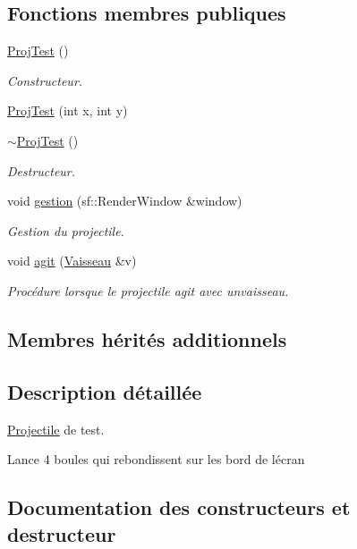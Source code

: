 \subsection*{Fonctions membres publiques}
\begin{DoxyCompactItemize}
\item 
\hyperlink{class_proj_test_a64855e6e7ef8219566ab0fde2b05a9e1}{Proj\+Test} ()
\begin{DoxyCompactList}\small\item\em Constructeur. \end{DoxyCompactList}\item 
\hyperlink{class_proj_test_ae1611498a5b25d561998068205e9f77f}{Proj\+Test} (int x, int y)
\item 
\hyperlink{class_proj_test_a9bc10c512035ae9f3294179c5d2db808}{$\sim$\+Proj\+Test} ()
\begin{DoxyCompactList}\small\item\em Destructeur. \end{DoxyCompactList}\item 
void \hyperlink{class_proj_test_a6649e6591e463315aa9513854e2515d4}{gestion} (sf\+::\+Render\+Window \&window)
\begin{DoxyCompactList}\small\item\em Gestion du projectile. \end{DoxyCompactList}\item 
void \hyperlink{class_proj_test_a3adb674973dcd21c6ddaee809b719a65}{agit} (\hyperlink{class_vaisseau}{Vaisseau} \&v)
\begin{DoxyCompactList}\small\item\em Procédure lorsque le projectile agit avec unvaisseau. \end{DoxyCompactList}\end{DoxyCompactItemize}
\subsection*{Membres hérités additionnels}


\subsection{Description détaillée}
\hyperlink{class_projectile}{Projectile} de test. 

Lance 4 boules qui rebondissent sur les bord de l\textquotesingle{}écran 

\subsection{Documentation des constructeurs et destructeur}
\mbox{\label{class_proj_test_a64855e6e7ef8219566ab0fde2b05a9e1}} 
